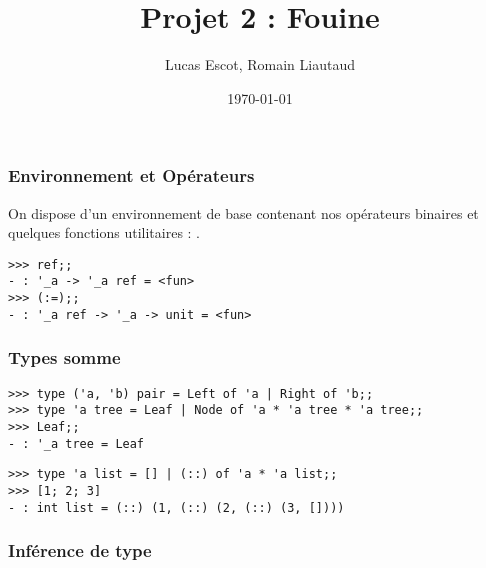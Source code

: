 \documentclass[9pt]{beamer}
\title{Projet 2 : Fouine}
\author{Lucas Escot, Romain Liautaud}
\date{\today}
\begin{document}
\frame{\titlepage}

\begin{frame}[fragile]
\frametitle{Environnement et Opérateurs}
On dispose d'un environnement de base contenant nos opérateurs binaires et quelques fonctions utilitaires : .
\begin{verbatim}
>>> ref;;
- : '_a -> '_a ref = <fun>
>>> (:=);;
- : '_a ref -> '_a -> unit = <fun>
\end{verbatim}
\end{frame}

\begin{frame}[fragile]
\frametitle{Types somme}
\begin{verbatim}
>>> type ('a, 'b) pair = Left of 'a | Right of 'b;;
>>> type 'a tree = Leaf | Node of 'a * 'a tree * 'a tree;;
>>> Leaf;;
- : '_a tree = Leaf
\end{verbatim}
\begin{verbatim}
>>> type 'a list = [] | (::) of 'a * 'a list;;
>>> [1; 2; 3]
- : int list = (::) (1, (::) (2, (::) (3, [])))
\end{verbatim}
\end{frame}

\begin{frame}
  \frametitle{Inférence de type}
\end{frame}
\end{document}
